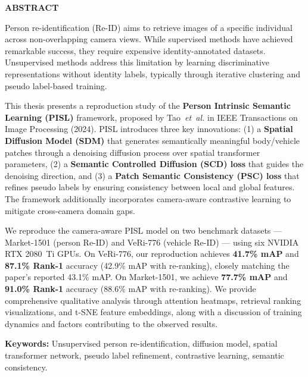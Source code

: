 \begin{center}
\textbf{\Large ABSTRACT}
\end{center}
\vspace{1cm}

Person re-identification (Re-ID) aims to retrieve images of a specific individual across non-overlapping camera views. While supervised methods have achieved remarkable success, they require expensive identity-annotated datasets. Unsupervised methods address this limitation by learning discriminative representations without identity labels, typically through iterative clustering and pseudo label-based training.

This thesis presents a reproduction study of the \textbf{Person Intrinsic Semantic Learning (PISL)} framework, proposed by Tao~\textit{et~al.} in IEEE Transactions on Image Processing (2024). PISL introduces three key innovations: (1) a \textbf{Spatial Diffusion Model (SDM)} that generates semantically meaningful body/vehicle patches through a denoising diffusion process over spatial transformer parameters, (2) a \textbf{Semantic Controlled Diffusion (SCD) loss} that guides the denoising direction, and (3) a \textbf{Patch Semantic Consistency (PSC) loss} that refines pseudo labels by ensuring consistency between local and global features. The framework additionally incorporates camera-aware contrastive learning to mitigate cross-camera domain gaps.

We reproduce the camera-aware PISL model on two benchmark datasets --- Market-1501 (person Re-ID) and VeRi-776 (vehicle Re-ID) --- using six NVIDIA RTX 2080~Ti GPUs. On VeRi-776, our reproduction achieves \textbf{41.7\% mAP} and \textbf{87.1\% Rank-1} accuracy (42.9\% mAP with re-ranking), closely matching the paper's reported 43.1\% mAP. On Market-1501, we achieve \textbf{77.7\% mAP} and \textbf{91.0\% Rank-1} accuracy (88.6\% mAP with re-ranking). We provide comprehensive qualitative analysis through attention heatmaps, retrieval ranking visualizations, and t-SNE feature embeddings, along with a discussion of training dynamics and factors contributing to the observed results.

\vspace{1cm}
\noindent\textbf{Keywords:} Unsupervised person re-identification, diffusion model, spatial transformer network, pseudo label refinement, contrastive learning, semantic consistency.
